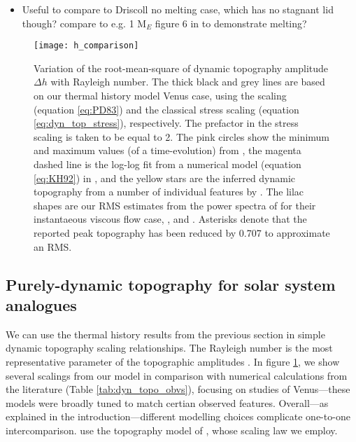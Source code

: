 \begin{itemize}
\item Useful to compare to Driscoll no melting case, which has no stagnant lid though? compare to e.g. 1 M$_E$ figure 6 in \citet{Kite2009} to demonstrate melting?
\end{itemize}




\begin{figure}
  \centering
  \texttt{[image: h\_comparison]}
\caption{Variation of the root-mean-square of dynamic topography amplitude $\Delta h$ with Rayleigh number. The thick black and grey lines are based on our thermal history model Venus case, using the \citet{Parsons1983} scaling (equation \ref{eq:PD83}) and the classical stress scaling (equation \ref{eq:dyn_top_stress}), respectively. The prefactor in the stress scaling is taken to be equal to 2. The pink circles show the minimum and maximum values (of a time-evolution) from \citet{Kiefer1998}, the magenta dashed line is the log-log fit from a numerical model (equation \ref{eq:KH92}) in \citet{Kiefer1992}, and the yellow stars are the inferred dynamic topography from a number of individual features by \citet{Nimmo1996}. The lilac shapes are our RMS estimates from the power spectra of \citet{Golle2012} for their instantaeous viscous flow case, \citet{Huang2013}, and \citet{Yang2016}. Asterisks denote that the reported peak topography has been reduced by 0.707 to approximate an RMS.}
\label{fig:RMS_benchmark}
\end{figure}


\subsection{Purely-dynamic topography for solar system analogues}

We can use the thermal history results from the previous section in simple dynamic topography scaling relationships. The Rayleigh number is the most representative parameter of the topographic amplitudes \citep[e.g.,][]{Kiefer1992}. In figure \ref{fig:RMS_benchmark}, we show several scalings from our model in comparison with numerical calculations from the literature (Table \ref{tab:dyn_topo_obvs}), focusing on studies of Venus---these models were broadly tuned to match certian observed features. Overall---as explained in the introduction---different modelling choices complicate one-to-one intercomparison. %
\citet{Nimmo1996} use the topography model of \citet{Parsons1983}, whose scaling law we employ.


